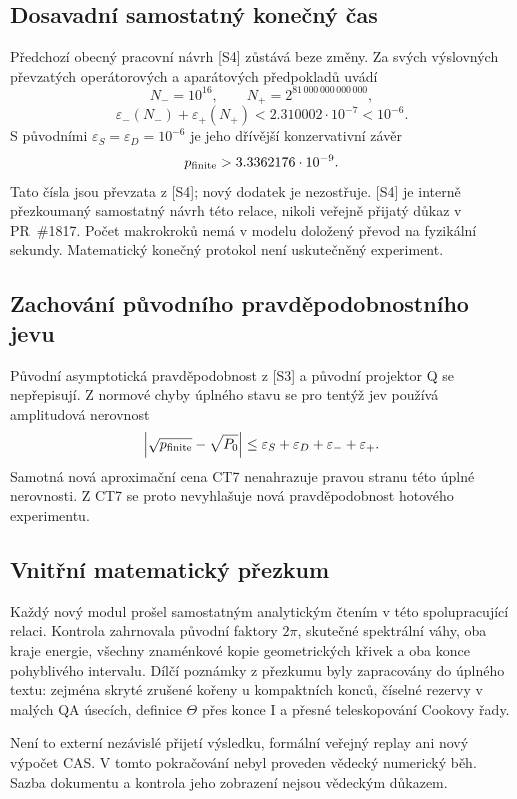 \documentclass[11pt,a4paper]{article}
\theoremstyle{remark}\newtheorem{remark}[theorem]{Poznámka}
\numberwithin{equation}{section}
\begin{document}
\subsection{Dosavadní samostatný konečný čas}

Předchozí obecný pracovní návrh [S4] zůstává beze změny.
Za svých výslovných převzatých operátorových a aparátových
předpokladů uvádí
\[
N_-=10^{16},\qquad N_+=2^{81\,000\,000\,000\,000},
\]
\[
\varepsilon_-(N_-)+\varepsilon_+(N_+)
<2.310002\cdot10^{-7}<10^{-6}.
\]
S původními \(\varepsilon_S=\varepsilon_D=10^{-6}\)
je jeho dřívější konzervativní závěr
\[
p_{\rm finite}>3.3362176\cdot10^{-9}.
\]
Tato čísla jsou převzata z [S4]; nový dodatek je nezostřuje.
[S4] je interně přezkoumaný samostatný návrh této relace,
nikoli veřejně přijatý důkaz v PR~\#1817. Počet makrokroků
nemá v modelu doložený převod na fyzikální sekundy.
Matematický konečný protokol není uskutečněný experiment.

\subsection{Zachování původního pravděpodobnostního jevu}

Původní asymptotická pravděpodobnost z [S3] a původní projektor
Q se nepřepisují. Z normové chyby úplného stavu se pro tentýž
jev používá amplitudová nerovnost
\[
\left|\sqrt{p_{\rm finite}}-\sqrt{P_0}\right|
\le\varepsilon_S+\varepsilon_D+\varepsilon_-+\varepsilon_+.
\]
Samotná nová aproximační cena CT7 nenahrazuje pravou stranu
této úplné nerovnosti. Z CT7 se proto nevyhlašuje nová
pravděpodobnost hotového experimentu.

\subsection{Vnitřní matematický přezkum}

Každý nový modul prošel samostatným analytickým čtením v této
spolupracující relaci. Kontrola zahrnovala původní faktory
\(2\pi\), skutečné spektrální váhy, oba kraje energie,
všechny znaménkové kopie geometrických křivek a oba konce
pohyblivého intervalu. Dílčí poznámky z přezkumu byly
zapracovány do úplného textu: zejména skryté zrušené kořeny
u kompaktních konců, číselné rezervy v malých QA úsecích,
definice \(\Theta\) přes konce I a přesné teleskopování Cookovy řady.

Není to externí nezávislé přijetí výsledku, formální veřejný
replay ani nový výpočet CAS. V tomto pokračování nebyl proveden
vědecký numerický běh. Sazba dokumentu a kontrola jeho zobrazení
nejsou vědeckým důkazem.
\end{document}
